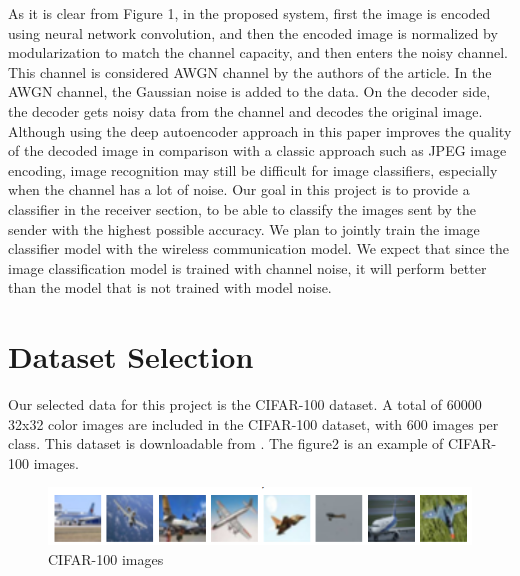 \documentclass[10pt,twocolumn,letterpaper]{article}
\begin{document}
As it is clear from Figure 1, in the proposed system, first the image is encoded using neural network convolution, and then the encoded image is normalized by modularization to match the channel capacity, and then enters the noisy channel. This channel is considered AWGN channel by the authors of the article. In the AWGN channel, the Gaussian noise is added to the data. On the decoder side, the decoder gets noisy data from the channel and decodes the original image. Although using the deep autoencoder approach in this paper improves the quality of the decoded image in comparison with a classic approach such as JPEG image encoding, image recognition may still be difficult for image classifiers, especially when the channel has a lot of noise. Our goal in this project is to provide a classifier in the receiver section, to be able to classify the images sent by the sender with the highest possible accuracy. We plan to jointly train the image classifier model with the wireless communication model. 
We expect that since the image classification model is trained with channel noise, it will perform better than the model that is not trained with model noise.
\section{Dataset Selection} 
\label{sec:dataset}
Our selected data for this project is the CIFAR-100 dataset\cite{Alpher08}. A total of 60000 32x32 color images are included in the CIFAR-100 dataset, with 600 images per class. This dataset is downloadable from \cite{Alpher09}. The figure2 is an example of CIFAR-100 images.
\begin{figure}[h]
    \centering
   \includegraphics[scale=0.55]{cifar100.png}
    \caption{CIFAR-100 images \cite{Alpher08}}
\end{figure}
\end{document}
